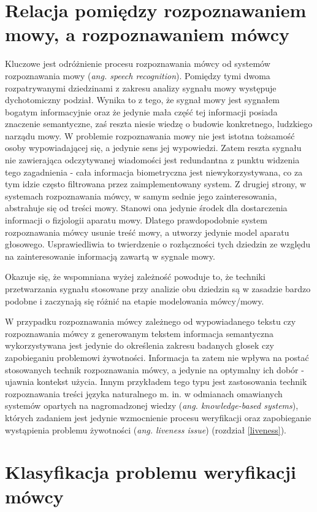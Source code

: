 \section{Relacja pomiędzy rozpoznawaniem mowy, a rozpoznawaniem mówcy}
Kluczowe jest odróżnienie procesu rozpoznawania mówcy od systemów rozpoznawania mowy (\textit{ang. speech recognition}). Pomiędzy tymi dwoma rozpatrywanymi dziedzinami z zakresu analizy sygnału mowy występuje dychotomiczny podział. Wynika to z tego, że sygnał mowy jest sygnałem bogatym informacyjnie oraz że jedynie mała część tej informacji posiada znaczenie semantyczne, zaś reszta niesie wiedzę o budowie konkretnego, ludzkiego narządu mowy. W problemie rozpoznawania mowy nie jest istotna tożsamość osoby wypowiadającej się, a jedynie sens jej wypowiedzi. Zatem reszta sygnału nie zawierająca odczytywanej wiadomości jest redundantna z punktu widzenia tego zagadnienia - cała informacja biometryczna jest niewykorzystywana, co za tym idzie często filtrowana przez zaimplementowany system. Z drugiej strony, w systemach rozpoznawania mówcy, w samym sednie jego zainteresowania, abstrahuje się od treści mowy. Stanowi ona jedynie środek dla dostarczenia informacji o fizjologii aparatu mowy. Dlatego prawdopodobnie system rozpoznawania mówcy usunie treść mowy, a utworzy jedynie model aparatu głosowego. Usprawiedliwia to twierdzenie o rozłączności tych dziedzin ze względu na zainteresowanie informacją zawartą w sygnale mowy. 

Okazuje się, że wspomniana wyżej zależność powoduje to, że techniki przetwarzania sygnału stosowane przy analizie obu dziedzin są w zasadzie bardzo podobne i zaczynają się różnić na etapie modelowania mówcy/mowy. 

W przypadku rozpoznawania mówcy zależnego od wypowiadanego tekstu czy rozpoznawania mówcy z generowanym tekstem informacja semantyczna wykorzystywana jest jedynie do określenia zakresu badanych głosek czy zapobieganiu problemowi żywotności. Informacja ta zatem nie wpływa na postać stosowanych technik rozpoznawania mówcy, a jedynie na optymalny ich dobór - ujawnia kontekst użycia. Innym przykładem tego typu jest zastosowania technik rozpoznawania treści języka naturalnego m. in. w odmianach omawianych systemów opartych na nagromadzonej wiedzy (\textit{ang. knowledge-based systems}), których zadaniem jest jedynie wzmocnienie procesu weryfikacji oraz zapobieganie wystąpienia problemu żywotności (\textit{ang. liveness issue}) (rozdział \ref{liveness}). 

\section{Klasyfikacja problemu weryfikacji mówcy}

